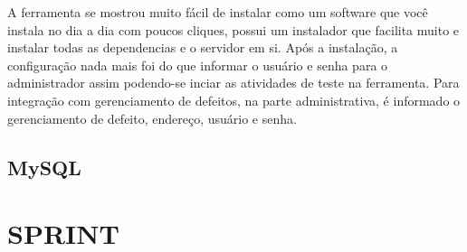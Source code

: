 \documentclass{abnt}
\begin{document}
			A ferramenta se mostrou muito fácil de instalar como um software que você instala no dia a dia com poucos cliques,
			possui um instalador que facilita muito e instalar todas as dependencias e o servidor em si. Após a instalação, a
			configuração nada mais foi do que informar o usuário e senha para o administrador assim podendo-se inciar as
			atividades de teste na ferramenta. Para integração com gerenciamento de defeitos, na parte administrativa, é
			informado o gerenciamento de defeito, endereço, usuário e senha. 
			
			
	\section{MySQL}
	
	

\clearpage
\chapter{SPRINT}
	
	\blindtext

\clearpage
\nocite{*}

%		
		
\end{document}
